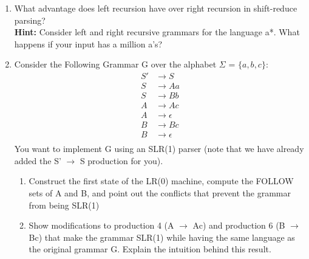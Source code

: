 \documentclass[11pt]{article}
\begin{document}
\begin{enumerate}
\begin{enumerate}
  \end{enumerate}
  
  \item What advantage does left recursion have over right recursion in shift-reduce parsing?\\
\textbf{Hint:} Consider left and right recursive grammars for the language a*. What happens if your input has a million a’s?

\newpage
\item Consider the Following Grammar G over the alphabet $\Sigma$ = $\{a,b,c\}$:
  \begin{equation*}
    \begin{split}
      S' &\to S \\
      S &\to Aa \\
      S &\to Bb \\
      A &\to Ac \\
      A &\to \epsilon\\
      B &\to Bc \\
      B &\to \epsilon \\
    \end{split}
  \end{equation*}
You want to implement G using an SLR(1) parser (note that we have already added the S' $\to$ S production for you). \begin{enumerate}
    \item Construct the first state of the LR(0) machine, compute the FOLLOW sets of A and B, and point out the conflicts that prevent the grammar from being SLR(1)
    \item Show modifications to production 4 (A $\to$ Ac) and production 6 (B $\to$ Bc) that make the grammar SLR(1) while having the same language as the original grammar G. Explain the intuition behind this result.
\end{enumerate} 
\end{enumerate}
\end{document}
